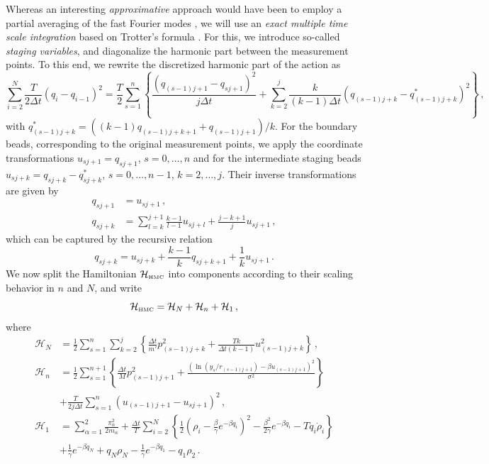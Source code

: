 \documentclass[11pt]{article}
\theoremstyle{definition}
\begin{document}
Whereas an interesting {\em approximative} approach would have been to employ a partial averaging of the fast Fourier modes \cite{doll_1985_fourier}, we will use an {\em exact multiple time scale integration} based on Trotter's formula \cite{tuckerman_1993}. For this, we introduce so-called {\it staging variables}, and diagonalize the harmonic part between the measurement points. To this end, we rewrite the discretized harmonic part of the action as
\begin{equation}
  \sum_{i=2}^{N}
  \frac{T}{2\Delta t}
  (q_i-q_{i-1})^2
  =
  \frac{T}{2}
  \sum_{s=1}^{n}\left\{
    \frac{(q_{(s-1)j+1} - q_{sj+1})^2}{j\Delta t}
    +
    \sum_{k=2}^j
    \frac{k}{(k-1)\Delta t}
    (q_{(s-1)j+k}-q^*_{(s-1)j+k})^2
  \right\}\,,
\end{equation}
with $  q^*_{(s-1)j+k}  =  ((k-1)q_{(s-1)j+k+1} + q_{(s-1)j+1} )/k$.
For the boundary beads, corresponding to the original measurement points, we apply the coordinate transformations
$  u_{sj+1} = q_{sj+1}$, $s=0,\dots,n$
and for the intermediate staging beads
$u_{sj+k} = q_{sj+k} - q^*_{sj+k}$, $s=0,\dots,n-1$, $k=2,\dots,j$.
Their inverse transformations are given by
\begin{align}
  q_{sj+1} &= u_{sj+1}\,,
  \\
  q_{sj+k} &= \sum_{l=k}^{j+1}\frac{k-1}{l-1}u_{sj+l}
  +\frac{j-k+1}{j}u_{sj+1}\,,
\end{align}
which can be captured by the recursive relation
\begin{equation}
  q_{sj+k} = u_{sj+k} + \frac{k-1}{k} q_{sj+k+1}+ \frac{1}{k}u_{sj+1} \,.
\end{equation}
We now split the Hamiltonian $\mathcal{H}_{\mbox{\tiny HMC}}$ into components according to their scaling behavior in $n$ and $N$, and write
\begin{equation}
  \mathcal{H}_{\mbox{\tiny HMC}}= \mathcal H_N+\mathcal H_n+\mathcal H_1\,,
\end{equation}
where
\begin{align}
  \mathcal H_N &=
  \frac{1}{2}
  \sum_{s=1}^{n}
  \sum_{k=2}^j
  \left\{
    \frac{\Delta t}{m'}p_{(s-1)j+k}^2
    +
    \frac{Tk}{\Delta t(k-1)}
    u_{(s-1)j+k}^2
  \right\}\,,\label{H_N}
  \\\label{H_n}
  \mathcal H_n &=
  \frac{1}{2}
  \sum_{s=1}^{n+1}
  \left\{
   \frac{\Delta t }{M}p_{(s-1)j+1}^2
    +
    \frac{(\ln(y_s/r_{(s-1)j+1}) - {\beta u_{(s-1)j+1}})^2}{\sigma^2}
   \right\}
   \\\nonumber
  &+
  \frac{T}{2j\Delta t}
  \sum_{s=1}^{n}
    (u_{(s-1)j+1} - u_{sj+1})^2
   \,,
  \\ \label{H_1}
  \mathcal H_1 &=
   \sum_{\alpha=1}^2\frac{\pi_\alpha^2}{2m_\alpha}
   +
  \frac{\Delta t}{T}
   \sum_{i=2}^{N}
   \left\{
    \frac{1}{2}
     \left(
        \rho_i-\frac{\beta}{\gamma}e^{-\beta q_i}
     \right)^2
    -
    \frac{\beta^2}{2\gamma}
    e^{-\beta q_i}
   -
    T q_i\dot\rho_i
   \right\}
  \\\nonumber
  &+
  \frac{1}{\gamma}
  e^{-\beta q_N}
  +
  q_N \rho_{N}
  -
  \frac{1}{\gamma}
  e^{-\beta q_1}
  -
  q_1 \rho_{2} \,.
\end{align}
\end{document}
